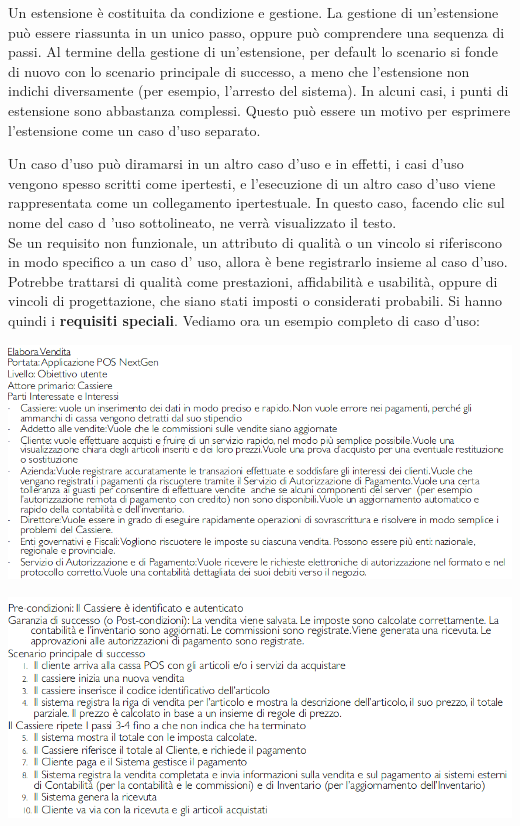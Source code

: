 \documentclass[a4paper,12pt, oneside]{book}
\begin{document}
\begin{enumerate}
\begin{center}
	\end{center}
	Un estensione è costituita da condizione e gestione. La gestione di un'estensione può essere riassunta in un unico passo, oppure può comprendere una sequenza di passi. Al termine della gestione di un'estensione, per default lo scenario si fonde di nuovo con lo scenario principale di successo, a meno che l'estensione non indichi diversamente (per esempio, l'arresto del sistema). In alcuni casi, i punti di estensione sono abbastanza complessi. Questo può essere un motivo per esprimere l'estensione come un caso d'uso separato.
\end{enumerate}
Un caso d'uso può diramarsi in un altro caso d'uso e in effetti, i casi d'uso vengono spesso scritti come ipertesti, e l'esecuzione di un altro caso d'uso viene rappresentata come un collegamento ipertestuale. In questo caso, facendo clic sul nome del caso d 'uso sottolineato, ne verrà visualizzato il testo.\\
Se un requisito non funzionale, un attributo di qualità o un vincolo si riferiscono in modo specifico a un caso d' uso, allora è bene registrarlo insieme al caso d'uso. Potrebbe trattarsi di qualità come prestazioni, affidabilità e usabilità, oppure di vincoli di progettazione, che siano stati imposti o considerati probabili. Si hanno quindi i \textbf{requisiti speciali}.
\newpage
Vediamo ora un esempio completo di caso d'uso:
\begin{center}
	\includegraphics[scale=0.57]{img/ca1.png}
\end{center}
\begin{center}
	\includegraphics[scale=0.57]{img/ca2.png}
\end{center}
\end{document}
